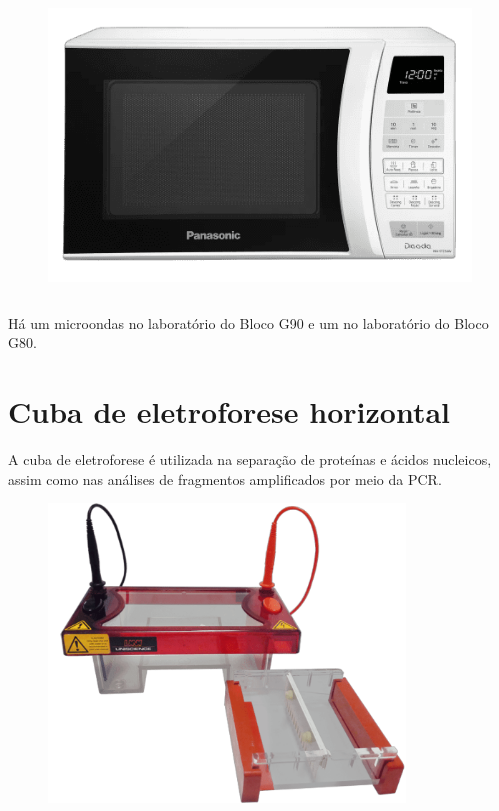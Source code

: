\documentclass[
  letterpaper,
  DIV=11,
  numbers=noendperiod]{scrreprt}
\begin{document}
\begin{figure}

{\centering \includegraphics[width=\textwidth,height=3.125in]{figures/equipamentos/Microondas.png}

}

\end{figure}

Há um microondas no laboratório do Bloco G90 e um no laboratório do
Bloco G80.

\hypertarget{cuba-de-eletroforese-horizontal}{%
\section{Cuba de eletroforese
horizontal}\label{cuba-de-eletroforese-horizontal}}

A cuba de eletroforese é utilizada na separação de proteínas e ácidos
nucleicos, assim como nas análises de fragmentos amplificados por meio
da PCR.

\begin{figure}

{\centering \includegraphics[width=\textwidth,height=3.125in]{figures/equipamentos/cuba_eletroforese_horizontal.png}

}

\end{figure}
\end{document}
